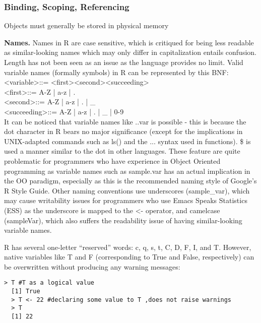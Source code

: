 \documentclass[12pt]{article}
\begin{document}
\subsubsection{Binding, Scoping, Referencing}

Objects must generally be stored in physical memory

\textbf{Names.} Names in R are case sensitive, which is critiqued for being less readable as similar-looking names which may only differ in capitalization entails confusion. Length has not been seen as an issue as the language provides no limit. Valid variable names (formally symbols) in R can be represented by this BNF: \\
\textless variable\textgreater ::= \textless first\textgreater \textless second\textgreater \textless succeeding\textgreater* \\
\textless first\textgreater ::= A-Z | a-z | . \\
\textless second\textgreater ::= A-Z | a-z | . | \_ \\
\textless succeeding\textgreater ::= A-Z | a-z | . | \_ | 0-9 \\

It can be noticed that variable names like ..var is possible - this is because the dot character in R bears no major significance (except for the implications in UNIX-adapted commands such as ls() and the ... syntax used in functions). \$ is used a manner similar to the dot in other languages. These feature are quite problematic for programmers who have experience in Object Oriented programming as variable names such as sample.var has an actual implication in the OO paradigm, especially as this is the recommended naming style of Google's R Style Guide. Other naming conventions use underscores (sample_var), which may cause writability issues for programmers who use Emacs Speaks Statistics (ESS) as the underscore is mapped to the <- operator, and camelcase (sampleVar), which also suffers the readability issue of having similar-looking variable names.

R has several one-letter ``reserved'' words: c, q, s, t, C, D, F, I, and T. However, native variables like T and F (corresponding to True and False, respectively) can be overwritten without producing any warning messages:

\begin{lstlisting}[frame=single]
  > T #T as a logical value
  [1] True
  > T <- 22 #declaring some value to T ,does not raise warnings
  > T
  [1] 22
\end{lstlisting}
\end{document}
